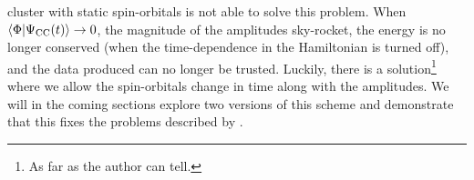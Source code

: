             cluster with static spin-orbitals is not able to solve this problem.
            When $\langle \Phi | \Psi_{\text{CC}}(t) \rangle \to 0$, the magnitude of the amplitudes
            sky-rocket, the energy is no longer conserved (when the
            time-dependence in the Hamiltonian is turned off), and the data
            produced can no longer be trusted.
            Luckily, there is a solution\footnote{
                As far as the author can tell.
            } where we allow the spin-orbitals change in time along with the
            amplitudes.
            We will in the coming sections explore two versions of this scheme
            and demonstrate that this fixes the problems described by
            \citeauthor{pedersen2018symplectic} \cite{pedersen2018symplectic}.

